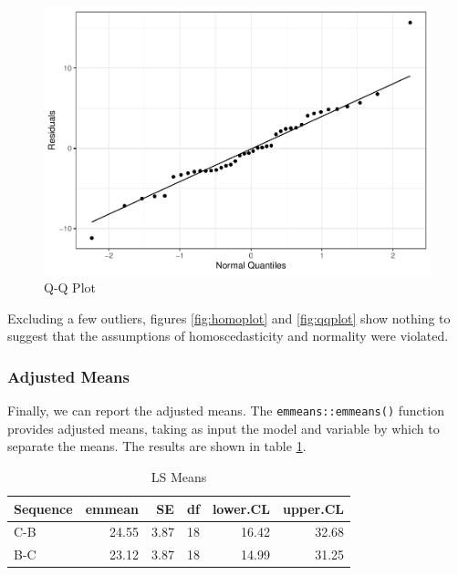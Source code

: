 \begin{figure}
\centering
\includegraphics{ch4_files/figure-latex/qqplot-1.pdf}
\caption{Q-Q Plot}
\end{figure}

Excluding a few outliers, figures \ref{fig:homoplot} and
\ref{fig:qqplot} show nothing to suggest that the assumptions of
homoscedasticity and normality were violated.

\subsubsection{Adjusted Means}\label{adjusted-means}

Finally, we can report the adjusted means. The
\texttt{emmeans::emmeans()} function provides adjusted means, taking as
input the model and variable by which to separate the means. The results
are shown in table \ref{tab:emmeans-table}.

\begin{Shaded}
\begin{Highlighting}[]
\OtherTok{\textless{}{-}} \SpecialCharTok{\textasciitilde{}}
\end{Highlighting}
\end{Shaded}

\begin{table}

\caption{\label{tab:emmeans-table}LS Means}
\centering
\begin{tabular}[t]{lrrrrr}
\toprule
Sequence & emmean & SE & df & lower.CL & upper.CL\\
\midrule
C-B & 24.55 & 3.87 & 18 & 16.42 & 32.68\\
B-C & 23.12 & 3.87 & 18 & 14.99 & 31.25\\
\bottomrule
\end{tabular}
\end{table}

